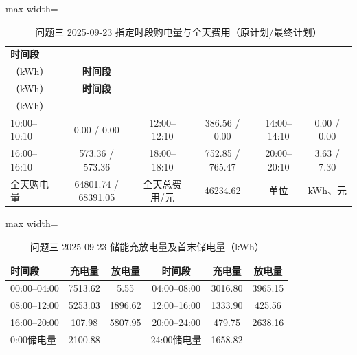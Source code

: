 \documentclass[UTF8,a4paper,zihao=-4,fontset=windows]{ctexart}
\begin{document}
\begin{table}[H]\centering
\fontsize{9.5}{12}\selectfont\setlength{\tabcolsep}{4pt}\renewcommand{\arraystretch}{1.12}
\begin{adjustbox}{max width=\linewidth}\begin{tabular}{lccccc}\toprule
\textbf{时间段} & \shortstack{\textbf{购电量}\\{\normalfont （kWh）}} & \textbf{时间段} & \shortstack{\textbf{购电量}\\{\normalfont （kWh）}} & \textbf{时间段} & \shortstack{\textbf{购电量}\\{\normalfont （kWh）}}\\\midrule
10:00–10:10 & 0.00 / 0.00 & 12:00–12:10 & 386.56 / 0.00 & 14:00–14:10 & 0.00 / 0.00\\
16:00–16:10 & 573.36 / 573.36 & 18:00–18:10 & 752.85 / 765.47 & 20:00–20:10 & 3.63 / 7.30\\
全天购电量 & 64801.74 / 68391.05 & 全天总费用/元 & 46234.62 & 单位 & kWh、元\\
\bottomrule\end{tabular}\end{adjustbox}
\caption{问题三 2025-09-23 指定时段购电量与全天费用（原计划/最终计划）}
\end{table}
\begin{table}[H]\centering
\fontsize{9.5}{12}\selectfont\setlength{\tabcolsep}{4pt}\renewcommand{\arraystretch}{1.12}
\begin{adjustbox}{max width=\linewidth}\begin{tabular}{lccccc}\toprule
\textbf{时间段} & \textbf{充电量} & \textbf{放电量} & \textbf{时间段} & \textbf{充电量} & \textbf{放电量}\\\midrule
00:00–04:00 & 7513.62 & 5.55 & 04:00–08:00 & 3016.80 & 3965.15\\
08:00–12:00 & 5253.03 & 1896.62 & 12:00–16:00 & 1333.90 & 425.56\\
16:00–20:00 & 107.98 & 5807.95 & 20:00–24:00 & 479.75 & 2638.16\\
0:00储电量 & 2100.88 & — & 24:00储电量 & 1658.82 & —\\
\bottomrule\end{tabular}\end{adjustbox}
\caption{问题三 2025-09-23 储能充放电量及首末储电量（kWh）}
\end{table}
\end{document}
